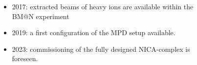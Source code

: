 \documentclass[dvipsnames] {beamer}
\begin{document}
\begin{frame}[shrink=40]
\begin{columns}[c]
\begin{block}{}
\begin{figure}[H]
      \end{figure}
    \end{block}
    \begin{block}{}
    \begin{itemize}
    \item {\color{red} 2017:} extracted beams of heavy ions are available within the BM@N experiment
    \item {\color{red} 2019}: a first configuration of the MPD setup available.
    \item {\color{red} 2023}: commissioning of the fully designed NICA-complex is foreseen.	
    \end{itemize}
 \end{block}

  \end{columns}
\end{frame}
\end{document}
